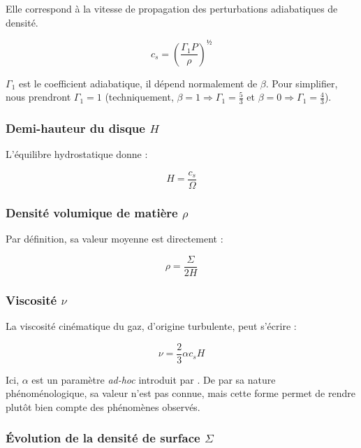 Elle correspond à la vitesse de propagation des perturbations adiabatiques de densité.

\begin{equation}
    \label{eq:vitesse_son}
    c_s = \left( \frac{\Gamma_1 P}{\rho} \right)^½
\end{equation}

$\Gamma_1$ est le coefficient adiabatique, il dépend normalement de $\beta$.
Pour simplifier, nous prendront $\Gamma_1 = 1$ (techniquement, $\beta = \num{1}
\Rightarrow \Gamma_1 = \frac{5}{3}$ et $\beta = \num{0} \Rightarrow \Gamma_1 =
\frac{4}{3}$).

\subsubsection{Demi-hauteur du disque $H$}

L’équilibre hydrostatique donne :

\begin{equation}
    \label{eq:hauteur}
    H = \frac{c_s}{\Omega}
\end{equation}

\subsubsection{Densité volumique de matière $\rho$}

Par définition, sa valeur moyenne est directement :

\begin{equation}
    \label{eq:densite}
    \rho = \frac{\Sigma}{2 H}
\end{equation}

\subsubsection{Viscosité $\nu$}

La viscosité cinématique du gaz, d’origine turbulente, peut s’écrire :

\begin{equation}
    \label{eq:viscosite}
    \nu = \frac{2}{3} \alpha c_s H
\end{equation}

Ici, $\alpha$ est un paramètre \textit{ad-hoc} introduit par \citet{1973}. De
par sa nature phénoménologique, sa valeur n’est pas connue, mais cette forme
permet de rendre plutôt bien compte des phénomènes observés.

\subsubsection{Évolution de la densité de surface $\Sigma$}

